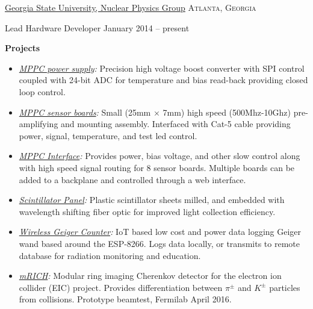 \documentclass[10pt,letterpaper]{article}
\begin{document}
\headedsection  %
  {\href{http://phynp6.phy-astr.gsu.edu}{Georgia State University, Nuclear Physics Group}}
  {\textsc{Atlanta, Georgia}} {
  \headedsubsection
    {Lead Hardware Developer}
    {January 2014 -- present}
    {
    \textbf{Projects}
    \begin{itemize}
      \renewcommand\labelitemi{--}
      \item \emph{\href{https://github.com/Sawaiz/mppcHighVoltage}{MPPC power supply}:}
        Precision high voltage boost converter with SPI control coupled with 24-bit ADC for temperature and bias read-back providing closed loop control.
      \item \emph{\href{https://github.com/Sawaiz/mppcSensor}{MPPC sensor boards}:}
        Small (25mm $\times$ 7mm) high speed (500Mhz-10Ghz) pre-amplifying and mounting assembly. Interfaced with Cat-5 cable providing power, signal, temperature, and test led control.
      \item \emph{\href{https://github.com/Sawaiz/mppcInterface}{MPPC Interface}:}
        Provides power, bias voltage, and other slow control along with high speed signal routing for 8 sensor boards. Multiple boards can be added to a backplane and controlled through a web interface.
      \item \emph{\href{https://github.com/Sawaiz/scintillatorPanel}{Scintillator Panel}:}
        Plastic scintillator sheets milled, and embedded with wavelength shifting fiber optic for improved light collection efficiency.
      \item \emph{\href{https://github.com/Sawaiz/wirelessGeigerCounter}{Wireless Geiger Counter}:}
        IoT based low cost and power data logging Geiger wand based around the ESP-8266. Logs data locally, or transmits to remote database for radiation monitoring and education.
      \item \emph{\href{https://github.com/Sawaiz/modularRICH}{mRICH}:}
        Modular ring imaging Cherenkov detector for the electron ion collider (EIC) project. Provides differentiation between $\pi^\pm$ and $K^\pm$ particles from collisions. Prototype beamtest, Fermilab April 2016.

\end{itemize}}}
\end{document}
